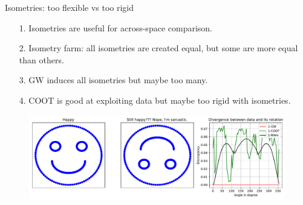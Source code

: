 \documentclass{beamer}
\begin{document}
\begin{frame}{Isometries: too flexible vs too rigid}
\scriptsize

\begin{enumerate}
  \item[1.] Isometries are useful for across-space comparison.
  \item[2.] Isometry farm: all isometries are created equal, but some are more equal than others.
  \item[3.] GW induces all isometries but maybe too many.
  \item[4.] COOT is good at exploiting data but maybe too rigid with isometries.
\end{enumerate}
\begin{figure}
    \centering
    \includegraphics[width=1.05\linewidth, keepaspectratio=true]{OT_new/div_vs_angle.pdf}
\end{figure}

\end{frame}
\end{document}
